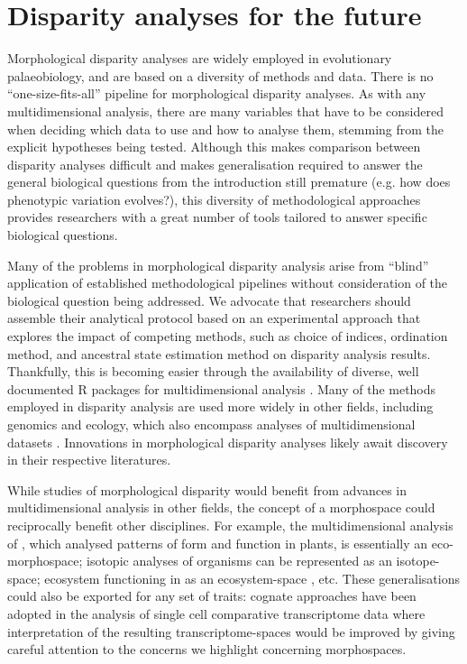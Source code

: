 \documentclass[12pt,letterpaper]{article}
\begin{document}
\section{Disparity analyses for the future} \label{section:future}

\noindent Morphological disparity analyses are widely employed in evolutionary palaeobiology, and are based on a diversity of methods and data.
There is no ``one-size-fits-all'' pipeline for morphological disparity analyses.
As with any multidimensional analysis, there are many variables that have to be considered when deciding which data to use and how to analyse them, stemming from the explicit hypotheses being tested.
Although this makes comparison between disparity analyses difficult and makes generalisation required to answer the general biological questions from the introduction still premature (e.g. how does phenotypic variation evolves?), this diversity of methodological approaches provides researchers with a great number of tools tailored to answer specific biological questions.

Many of the problems in morphological disparity analysis arise from ``blind'' application of established methodological pipelines without consideration of the biological question being addressed.
We advocate that researchers should assemble their analytical protocol based on an experimental approach that explores the impact of competing methods, such as choice of indices, ordination method, and ancestral state estimation method on disparity analysis results.
Thankfully, this is becoming easier through the availability of diverse, well documented R packages for multidimensional analysis \citep{Bouxin2005, oksanen2007vegan, Harmon2008, lloyd2016, Guillerme2018b}.
Many of the methods employed in disparity analysis are used more widely in other fields, including genomics and ecology, which also encompass analyses of multidimensional datasets \citep{Donohue2013, Saupe2015, Canter2018, mammola2019}.
Innovations in morphological disparity analyses likely await discovery in their respective literatures.

While studies of morphological disparity would benefit from advances in multidimensional analysis in other fields, the concept of a morphospace could reciprocally benefit other disciplines.
For example, the multidimensional analysis of \citep{Diaz2016}, which analysed patterns of form and function in plants, is essentially an eco-morphospace; isotopic analyses of organisms \citep{Jackson2011,Swanson2015} can be represented as an isotope-space; ecosystem functioning in \citealt{Donohue2013} as an ecosystem-space \citep{qiao2017}, etc.
These generalisations could also be exported for any set of traits: cognate approaches have been adopted in the analysis of single cell comparative transcriptome data \citep{Sebe-Pedros2018} where interpretation of the resulting transcriptome-spaces would be improved by giving careful attention to the concerns we highlight concerning morphospaces.
\end{document}
